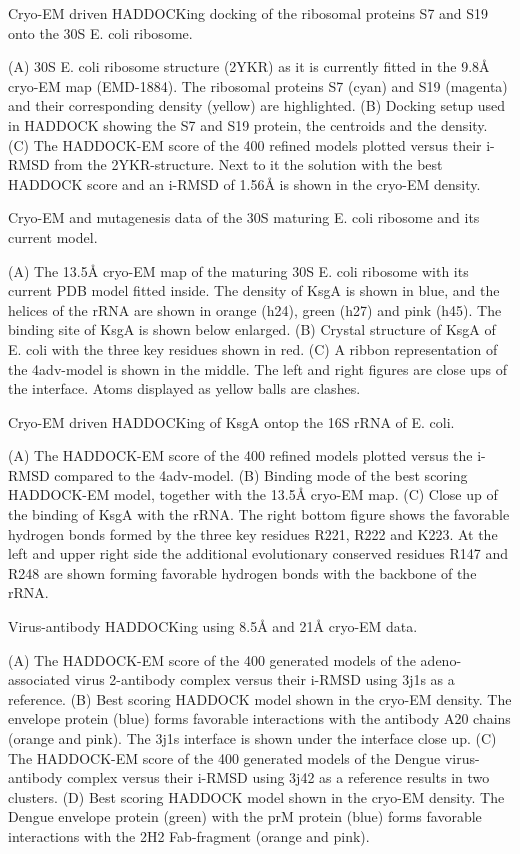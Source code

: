 \caption{Cryo-EM driven HADDOCKing docking of the ribosomal proteins S7 and S19 onto the 30S E. coli ribosome.}
{(A) 30S E. coli ribosome structure (2YKR) as it is currently fitted in the 9.8Å cryo-EM map (EMD-1884). The ribosomal proteins S7 (cyan) and S19 (magenta) and their corresponding density (yellow) are highlighted. 
(B) Docking setup used in HADDOCK showing the S7 and S19 protein, the centroids and the density. 
(C) The HADDOCK-EM score of the 400 refined models plotted versus their i-RMSD from the 2YKR-structure. Next to it the solution with the best HADDOCK score and an i-RMSD of 1.56Å is shown in the cryo-EM density.}
\stopbuffer


\caption{Cryo-EM and mutagenesis data of the 30S maturing E. coli ribosome and its current model.}
{(A) The 13.5Å cryo-EM map of the maturing 30S E. coli ribosome with its current PDB model fitted inside. The density of KsgA is shown in blue, and the helices of the rRNA are shown in orange (h24), green (h27) and pink (h45). The binding site of KsgA is shown below enlarged.
(B) Crystal structure of KsgA of E. coli with the three key residues shown in red. 
(C) A ribbon representation of the 4adv-model is shown in the middle. The left and right figures are close ups of the interface. Atoms displayed as yellow balls are clashes.}
\stopbuffer


\caption{Cryo-EM driven HADDOCKing of KsgA ontop the 16S rRNA of E. coli.}
{(A) The HADDOCK-EM score of the 400 refined models plotted versus the i-RMSD compared to the 4adv-model. 
(B) Binding mode of the best scoring HADDOCK-EM model, together with the 13.5Å cryo-EM map.
(C) Close up of the binding of KsgA with the rRNA. The right bottom figure shows the favorable hydrogen bonds formed by the three key residues R221, R222 and K223. At the left and upper right side the additional evolutionary conserved residues R147 and R248 are shown forming favorable hydrogen bonds with the backbone of the rRNA.}
\stopbuffer


\caption{Virus-antibody HADDOCKing using 8.5Å and 21Å cryo-EM data.}
{ (A) The HADDOCK-EM score of the 400 generated models of the adeno-associated virus 2-antibody complex versus their i-RMSD using 3j1s as a reference.
 (B) Best scoring HADDOCK model shown in the cryo-EM density. The envelope protein (blue) forms favorable interactions with the antibody A20 chains (orange and pink). The 3j1s interface is shown under the interface close up. 
  (C) The HADDOCK-EM score of the 400 generated models of the Dengue virus-antibody complex versus their i-RMSD using 3j42 as a reference results in two clusters.
  (D) Best scoring HADDOCK model shown in the cryo-EM density. The Dengue envelope protein (green) with the prM protein (blue) forms favorable interactions with the 2H2 Fab-fragment (orange and pink).}
\stopbuffer



